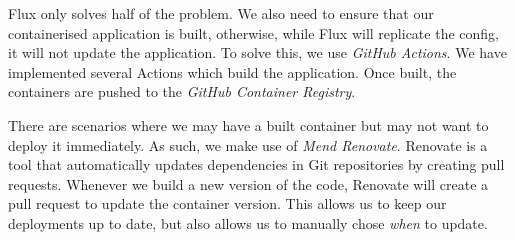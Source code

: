 \noindent{}Flux only solves half of the problem. We also need to ensure that our
containerised application is built, otherwise, while Flux will replicate the
config, it will not update the application. To solve this, we use \textit{GitHub
Actions}. We have implemented several Actions which build the application. Once
built, the containers are pushed to the \textit{GitHub Container Registry}.

\noindent{}There are scenarios where we may have a built container but may not
want to deploy it immediately. As such, we make use of \textit{Mend Renovate}.
Renovate is a tool that automatically updates dependencies in Git repositories
by creating pull requests. Whenever we build a new version of the code, Renovate
will create a pull request to update the container version. This allows us to
keep our deployments up to date, but also allows us to manually chose
\textit{when} to update.